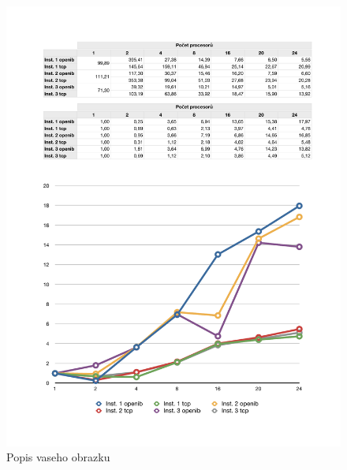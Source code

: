 \documentclass[a4paper]{article}
\begin{document}
\begin{figure}[ht]
\centerline{\includegraphics[width=\textwidth]{table-rel.pdf}}
\caption{Popis vaseho obrazku}
\label{table-rel}
\end{figure}
\end{document}
